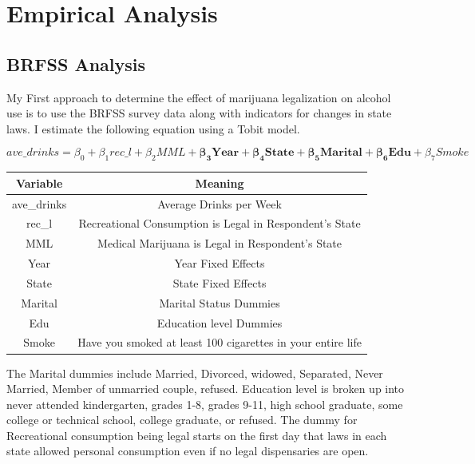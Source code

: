 \documentclass[11pt]{article}
\begin{document}
\section{Empirical Analysis}

\subsection{BRFSS Analysis}

My First approach to determine the effect of marijuana legalization on alcohol use is to use the BRFSS survey data along with indicators for changes in state laws. I estimate the following equation using a Tobit model. 

$$
ave\_drinks = \beta_0 +  \beta_1  rec\_l  + \beta_2MML + \bm{\beta_3 Year} + \bm{\beta_4 State} + \bm{\beta_5 Marital} + \bm{\beta_6 Edu} + \beta_7 Smoke
$$

\begin{center}
	\begin{tabular}{||c | c||} 
		\hline
		Variable & Meaning  \\ [0.5ex] 
		\hline\hline
		ave\_drinks & Average Drinks per Week \\ 
		\hline 
		rec\_l & Recreational Consumption is Legal in Respondent's State  \\ 
		\hline
		MML & Medical Marijuana is Legal in Respondent's State  \\
		\hline
		Year & Year Fixed Effects \\
		\hline
		State & State Fixed Effects\\
		\hline
		Marital & Marital Status Dummies  \\ 
		\hline
		Edu & Education level Dummies \\
		\hline
		Smoke & Have you smoked at least 100 cigarettes in your entire life\\[1ex] 
		\hline
	\end{tabular}
\end{center}


The Marital dummies include Married, Divorced, widowed, Separated, Never Married, Member of unmarried couple, refused. Education level is broken up into never attended kindergarten, grades 1-8, grades 9-11, high school graduate, some college or technical school, college graduate, or refused. The dummy for Recreational consumption being legal starts on the first day that laws in each state allowed personal consumption even if no legal dispensaries are open. \par 
\end{document}

